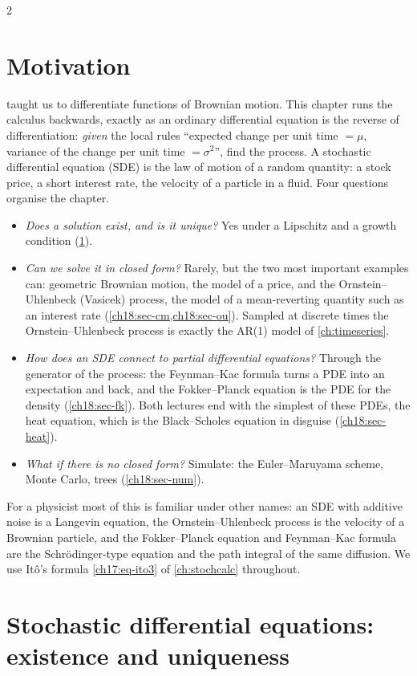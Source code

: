\begin{paracol}{2}
\section*{Motivation}
 taught us to differentiate functions of Brownian motion. This chapter runs the calculus backwards, exactly as an ordinary differential equation is the reverse of differentiation: \emph{given} the local rules ``expected change per unit time $=\mu$, variance of the change per unit time $=\sigma^2$'', find the process. A stochastic differential equation (SDE) is the law of motion of a random quantity: a stock price, a short interest rate, the velocity of a particle in a fluid. Four questions organise the chapter.
\begin{itemize}
  \item \emph{Does a solution exist, and is it unique?} Yes under a Lipschitz and a growth condition (\cref{ch18:sec-exist}).
  \item \emph{Can we solve it in closed form?} Rarely, but the two most important examples can: geometric Brownian motion, the model of a price, and the Ornstein--Uhlenbeck (Vasicek) process, the model of a mean-reverting quantity such as an interest rate (\cref{ch18:sec-cm,ch18:sec-ou}). Sampled at discrete times the Ornstein--Uhlenbeck process is exactly the AR(1) model of \cref{ch:timeseries}.
  \item \emph{How does an SDE connect to partial differential equations?} Through the generator of the process: the Feynman--Kac formula turns a PDE into an expectation and back, and the Fokker--Planck equation is the PDE for the density (\cref{ch18:sec-fk}). Both lectures end with the simplest of these PDEs, the heat equation, which is the Black--Scholes equation in disguise (\cref{ch18:sec-heat}).
  \item \emph{What if there is no closed form?} Simulate: the Euler--Maruyama scheme, Monte Carlo, trees (\cref{ch18:sec-num}).
\end{itemize}
For a physicist most of this is familiar under other names: an SDE with additive noise is a Langevin equation, the Ornstein--Uhlenbeck process is the velocity of a Brownian particle, and the Fokker--Planck equation and Feynman--Kac formula are the Schr\"odinger-type equation and the path integral of the same diffusion. We use It\^o's formula \eqref{ch17:eq-ito3} of \cref{ch:stochcalc} throughout.

\section{Stochastic differential equations: existence and uniqueness}\label{ch18:sec-exist}


\end{paracol}
